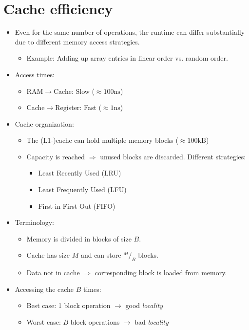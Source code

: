 \documentclass[12pt, a4paper]{scrartcl}
\renewcommand{\implies}{\Rightarrow}
\begin{document}
\section{Cache efficiency}
\label{sec:cache_efficiency}
\begin{itemize}
\item Even for the same number of operations, the runtime can differ substantially due to different memory access strategies.
  \begin{itemize}
  \item Example: Adding up array entries in linear order vs. random order.
  \end{itemize}
\item Access times:
  \begin{itemize}
  \item RAM$\rightarrow$Cache: Slow ($\approx 100\mathrm{ns}$)
  \item Cache$\rightarrow$Register: Fast ($\approx 1\mathrm{ns}$)
  \end{itemize}
\item Cache organization:
  \begin{itemize}
  \item The (L1-)cache can hold multiple memory blocks
    ($\approx 100\mathrm{kB}$)
  \item Capacity is reached $\implies$ unused blocks are discarded. Different strategies:
    \begin{itemize}
    \item Least Recently Used (LRU)
    \item Least Frequently Used (LFU)
    \item First in First Out (FIFO)
    \end{itemize}
  \end{itemize}
\item Terminology:
  \begin{itemize}
  \item Memory is divided in blocks of size $B$.
  \item Cache has size $M$ and can store $^M/_B$ blocks.
  \item Data not in cache $\implies$ corresponding block is loaded from memory.
  \end{itemize}
\item Accessing the cache $B$ times:
  \begin{itemize}
  \item Best case: 1 block operation $\rightarrow$ good \emph{locality}
  \item Worst case: $B$ block operations $\rightarrow$ bad \emph{locality}

\end{itemize}
\end{itemize}
\end{document}
